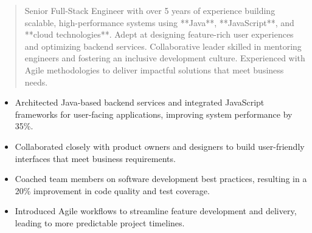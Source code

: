 



\makecvheader

\begin{quote}
  \noindent
  Senior Full-Stack Engineer with over 5 years of experience building scalable, high-performance systems using **Java**, **JavaScript**, and **cloud technologies**. Adept at designing feature-rich user experiences and optimizing backend services. Collaborative leader skilled in mentoring engineers and fostering an inclusive development culture. Experienced with Agile methodologies to deliver impactful solutions that meet business needs.
\end{quote}

\par\smallskip
\noindent
\begin{minipage}{20cm}
  \begin{minipage}{9.75cm}
    \begin{itemize}
      \item Architected Java-based backend services and integrated JavaScript frameworks for user-facing applications, improving system performance by 35\%.
      \item Collaborated closely with product owners and designers to build user-friendly interfaces that meet business requirements.
    \end{itemize}
  \end{minipage}
  \hfill
  \begin{minipage}{9.75cm}
    \begin{itemize}
      \item Coached team members on software development best practices, resulting in a 20\% improvement in code quality and test coverage.
      \item Introduced Agile workflows to streamline feature development and delivery, leading to more predictable project timelines.
    \end{itemize}
  \end{minipage}
\end{minipage}
\par\smallskip
\divider

